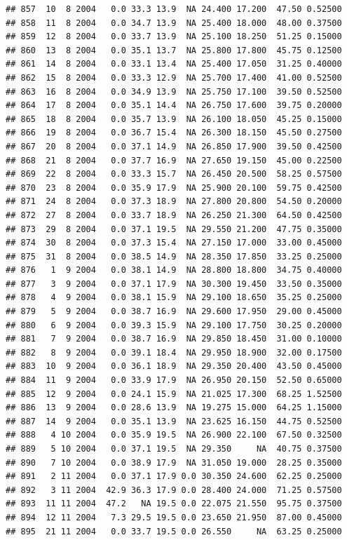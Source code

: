 \documentclass[
]{book}
\begin{document}
\begin{verbatim}
## 857  10  8 2004   0.0 33.3 13.9  NA 24.400 17.200  47.50 0.52500
## 858  11  8 2004   0.0 34.7 13.9  NA 25.400 18.000  48.00 0.37500
## 859  12  8 2004   0.0 33.7 13.9  NA 25.100 18.250  51.25 0.15000
## 860  13  8 2004   0.0 35.1 13.7  NA 25.800 17.800  45.75 0.12500
## 861  14  8 2004   0.0 33.1 13.4  NA 25.400 17.050  31.25 0.40000
## 862  15  8 2004   0.0 33.3 12.9  NA 25.700 17.400  41.00 0.52500
## 863  16  8 2004   0.0 34.9 13.9  NA 25.750 17.100  39.50 0.52500
## 864  17  8 2004   0.0 35.1 14.4  NA 26.750 17.600  39.75 0.20000
## 865  18  8 2004   0.0 35.7 13.9  NA 26.100 18.050  45.25 0.15000
## 866  19  8 2004   0.0 36.7 15.4  NA 26.300 18.150  45.50 0.27500
## 867  20  8 2004   0.0 37.1 14.9  NA 26.850 17.900  39.50 0.42500
## 868  21  8 2004   0.0 37.7 16.9  NA 27.650 19.150  45.00 0.22500
## 869  22  8 2004   0.0 33.3 15.7  NA 26.450 20.500  58.25 0.57500
## 870  23  8 2004   0.0 35.9 17.9  NA 25.900 20.100  59.75 0.42500
## 871  24  8 2004   0.0 37.3 18.9  NA 27.800 20.800  54.50 0.20000
## 872  27  8 2004   0.0 33.7 18.9  NA 26.250 21.300  64.50 0.42500
## 873  29  8 2004   0.0 37.1 19.5  NA 29.550 21.200  47.75 0.35000
## 874  30  8 2004   0.0 37.3 15.4  NA 27.150 17.000  33.00 0.45000
## 875  31  8 2004   0.0 38.5 14.9  NA 28.350 17.850  33.25 0.25000
## 876   1  9 2004   0.0 38.1 14.9  NA 28.800 18.800  34.75 0.40000
## 877   3  9 2004   0.0 37.1 17.9  NA 30.300 19.450  33.50 0.35000
## 878   4  9 2004   0.0 38.1 15.9  NA 29.100 18.650  35.25 0.25000
## 879   5  9 2004   0.0 38.7 16.9  NA 29.600 17.950  29.00 0.45000
## 880   6  9 2004   0.0 39.3 15.9  NA 29.100 17.750  30.25 0.20000
## 881   7  9 2004   0.0 38.7 16.9  NA 29.850 18.450  31.00 0.10000
## 882   8  9 2004   0.0 39.1 18.4  NA 29.950 18.900  32.00 0.17500
## 883  10  9 2004   0.0 36.1 18.9  NA 29.350 20.400  43.50 0.45000
## 884  11  9 2004   0.0 33.9 17.9  NA 26.950 20.150  52.50 0.65000
## 885  12  9 2004   0.0 24.1 15.9  NA 21.025 17.300  68.25 1.52500
## 886  13  9 2004   0.0 28.6 13.9  NA 19.275 15.000  64.25 1.15000
## 887  14  9 2004   0.0 35.1 13.9  NA 23.625 16.150  44.75 0.52500
## 888   4 10 2004   0.0 35.9 19.5  NA 26.900 22.100  67.50 0.32500
## 889   5 10 2004   0.0 37.1 19.5  NA 29.350     NA  40.75 0.37500
## 890   7 10 2004   0.0 38.9 17.9  NA 31.050 19.000  28.25 0.35000
## 891   2 11 2004   0.0 37.1 17.9 0.0 30.350 24.600  62.25 0.25000
## 892   3 11 2004  42.9 36.3 17.9 0.0 28.400 24.000  71.25 0.57500
## 893  11 11 2004  47.2   NA 19.5 0.0 22.075 21.550  95.75 0.37500
## 894  12 11 2004   7.3 29.5 19.5 0.0 23.650 21.950  87.00 0.45000
## 895  21 11 2004   0.0 33.7 19.5 0.0 26.550     NA  63.25 0.25000

\end{verbatim}
\end{document}
